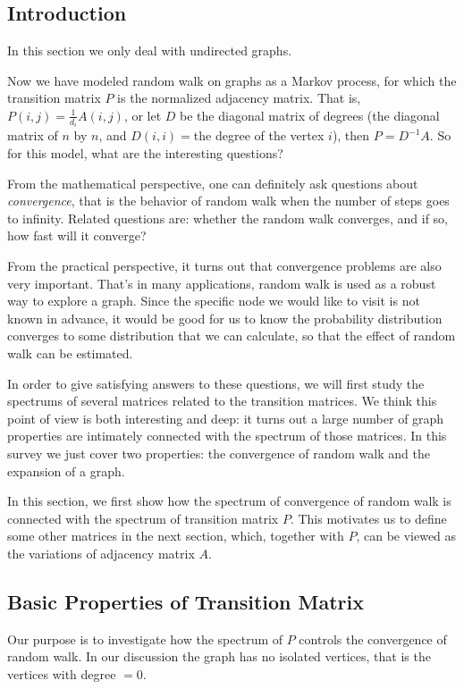 \subsection{Introduction}
In this section we only deal with undirected graphs.

Now we have modeled random walk on graphs as a Markov process, for
which the transition matrix $P$ is the normalized adjacency matrix.
That is, $P(i, j)=\frac{1}{d_i} A(i, j)$, or let $D$ be the diagonal
matrix of degrees (the diagonal matrix of $n$ by $n$, and $D(i,
i)=$the degree of the vertex $i$), then $P=D^{-1}A$. So for this
model, what are the interesting questions?

From the mathematical perspective, one can definitely ask questions
about \emph{convergence}, that is the behavior of random walk when
the number of steps goes to infinity. Related questions are: whether
the random walk converges, and if so, how fast will it converge?

From the practical perspective, it turns out that convergence
problems are also very important. That's in many applications, random walk is used as
a robust way to explore a graph. Since the specific node we would like to visit is not known in
advance, it would be good for us to know the probability distribution converges
to some distribution that we can calculate, so that the
effect of random walk can be estimated.

In order to give satisfying answers to these questions, we will
first study the spectrums of several matrices related to the
transition matrices. We think this point of view is both interesting
and deep: it turns out a large number of graph properties are intimately
connected with the spectrum of those matrices. In this survey we just cover
two properties: the convergence of random walk and the expansion of a graph.

In this section, we first show how
the spectrum of convergence of random walk is connected with the spectrum of
transition matrix $P$. This motivates us to define some other matrices in the next section,
which, together with $P$, can be viewed as the variations of adjacency matrix $A$.

\subsection{Basic Properties of Transition Matrix}

Our purpose is to investigate how the spectrum of $P$ controls the
convergence of random walk. In our discussion the graph has no
isolated vertices, that is the vertices with degree $=0$.

